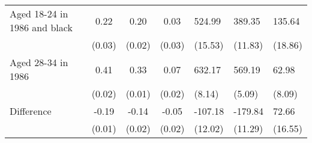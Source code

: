 \begin{table}[htbp]\centering
    \begin{tabular}{l*{3}{c}}
Aged 18-24 in 1986 and black&0.22&0.20&0.03&524.99&389.35&135.64\\
&(0.03)&(0.02)&(0.03)&(15.53)&(11.83)&(18.86)\\
Aged 28-34 in 1986&0.41&0.33&0.07&632.17&569.19&62.98\\
&(0.02)&(0.01)&(0.02)&(8.14)&(5.09)&(8.09)\\
Difference&-0.19&-0.14&-0.05&-107.18&-179.84&72.66\\
&(0.01)&(0.02)&(0.02)&(12.02)&(11.29)&(16.55)\\
\end{tabular}
\end{table}